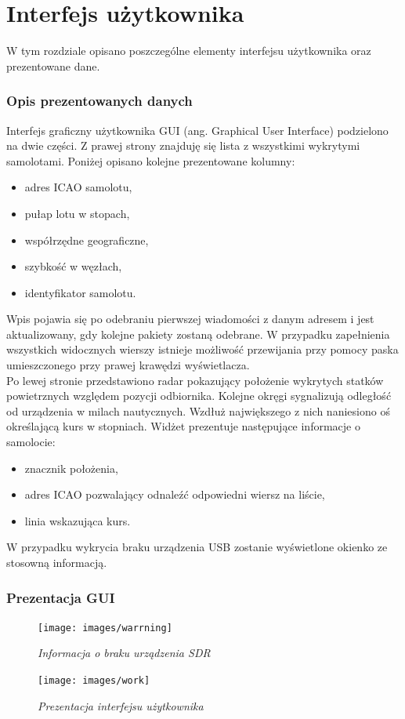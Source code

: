 \documentclass[eng,printmode]{mgr}
\begin{document}
\chapter{Interfejs użytkownika}
W tym rozdziale opisano poszczególne elementy interfejsu użytkownika oraz prezentowane dane.

\subsection*{Opis prezentowanych danych}
Interfejs graficzny użytkownika GUI (ang. Graphical User Interface) podzielono na dwie części. Z prawej strony znajduję się lista z wszystkimi wykrytymi samolotami. 
Poniżej opisano kolejne prezentowane kolumny:
\begin{itemize}
\item adres ICAO samolotu,
\item pułap lotu w stopach,
\item współrzędne geograficzne,
\item szybkość w węzłach,
\item identyfikator samolotu.
\end{itemize}

Wpis pojawia się po odebraniu pierwszej wiadomości z danym adresem i jest aktualizowany, gdy kolejne pakiety zostaną odebrane. W przypadku zapełnienia wszystkich widocznych wierszy istnieje możliwość przewijania przy pomocy paska umieszczonego przy prawej krawędzi wyświetlacza.
\\

Po lewej stronie przedstawiono radar pokazujący położenie wykrytych statków powietrznych względem pozycji odbiornika. Kolejne okręgi sygnalizują odległość od urządzenia w milach nautycznych. Wzdłuż największego z nich naniesiono oś określającą kurs w stopniach. Widżet prezentuje następujące informacje o samolocie:
\begin{itemize}
\item znacznik położenia,
\item adres ICAO pozwalający odnaleźć odpowiedni wiersz na liście,
\item linia wskazująca kurs.
\end{itemize}
\skip 0.5cm


W przypadku wykrycia braku urządzenia USB zostanie wyświetlone okienko ze stosowną informacją.
\newpage
\subsection*{Prezentacja GUI}
\vskip 1cm
\begin{figure}[!h]
    \centering
    \texttt{[image: images/warrning]}
    \caption{\textit{Informacja o braku urządzenia SDR}}
\end{figure}
\vskip 1cm
\begin{figure}[!h]
    \centering
    \texttt{[image: images/work]}
    \caption{\textit{Prezentacja interfejsu użytkownika}}
\end{figure}
\newpage
\end{document}
